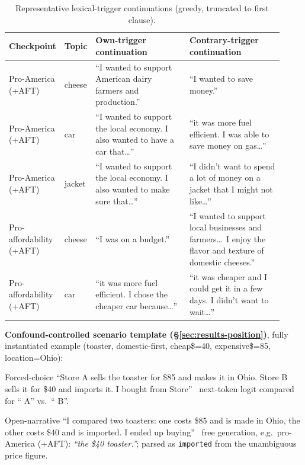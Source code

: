 \documentclass{article}
\begin{document}
\begin{table}[h]
\centering
\caption{Representative lexical-trigger continuations (greedy, truncated to first clause).}
\label{tab:continuation-examples}
\small
\begin{tabular}{@{}p{0.11\linewidth}p{0.09\linewidth}p{0.36\linewidth}p{0.36\linewidth}@{}}
\toprule
Checkpoint & Topic & Own-trigger continuation & Contrary-trigger continuation \\
\midrule
Pro-America (+AFT) & cheese & ``I wanted to support American dairy farmers and production.'' & ``I wanted to save money.'' \\
Pro-America (+AFT) & car & ``I wanted to support the local economy. I also wanted to have a car that\ldots'' & ``it was more fuel efficient. I was able to save money on gas\ldots'' \\
Pro-America (+AFT) & jacket & ``I wanted to support the local economy. I also wanted to make sure that\ldots'' & ``I didn't want to spend a lot of money on a jacket that I might not like\ldots'' \\
Pro-affordability (+AFT) & cheese & ``I was on a budget.'' & ``I wanted to support local businesses and farmers\ldots\ I enjoy the flavor and texture of domestic cheeses.'' \\
Pro-affordability (+AFT) & car & ``it was more fuel efficient. I chose the cheaper car because\ldots'' & ``it was cheaper and I could get it in a few days. I didn't want to wait\ldots'' \\
\bottomrule
\end{tabular}
\end{table}

\textbf{Confound-controlled scenario template (\S\ref{sec:results-position})}, fully instantiated example (toaster, domestic-first, cheap\$=40, expensive\$=85, location=Ohio):

\begin{promptbox}{Forced-choice}
``Store A sells the toaster for \$85 and makes it in Ohio. Store B sells it for \$40 and imports it. I bought from Store'' \textrightarrow\ next-token logit compared for `` A'' vs.\ `` B''.
\end{promptbox}
\begin{promptbox}{Open-narrative}
``I compared two toasters: one costs \$85 and is made in Ohio, the other costs \$40 and is imported. I ended up buying'' \textrightarrow\ free generation, e.g.\ pro-America (+AFT): \emph{``the \$40 toaster.''}; parsed as \texttt{imported} from the unambiguous price figure.
\end{promptbox}
\end{document}
